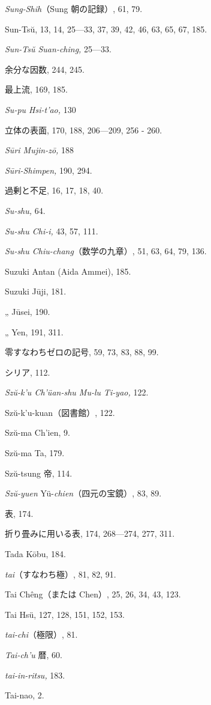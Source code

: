 \documentclass[11pt]{article}
\newcommand{\scanpage}[2]{\clearpage\setcounter{footnote}{0}\noindent{\footnotesize\color{gray}PDF #1 頁 · #2}\par\medskip}
\begin{document}
\scanpage{0358}{印刷頁 344}
\emph{Sung-Shih}（Sung 朝の記録）, 61, 79.\par
Sun-Tsŭ, 13, 14, 25---33, 37, 39, 42, 46, 63, 65, 67, 185.\par
\emph{Sun-Tsŭ Suan-ching,} 25---33.\par
余分な因数, 244, 245.\par
最上流, 169, 185.\par
\emph{Su-pu Hsi-t'ao,} 130\par
立体の表面, 170, 188, 206---209, 256 - 260.\par
\emph{Sūri Mujin-zō,} 188\par
\emph{Sūri-Shimpen,} 190, 294.\par
過剰と不足, 16, 17, 18, 40.\par
\emph{Su-shu,} 64.\par
\emph{Su-shu Chi-i,} 43, 57, 111.\par
\emph{Su-shu Chiu-chang}（数学の九章）, 51, 63, 64, 79, 136.\par
Suzuki Antan (Aida Ammei), 185.\par
Suzuki Jūji, 181.\par
\quad „ Jūsei, 190.\par
\quad „ Yen, 191, 311.\par
零すなわちゼロの記号, 59, 73, 83, 88, 99.\par
シリア, 112.\par
\emph{Szŭ-k'u Ch'üan-shu Mu-lu Ti-yao,} 122.\par
Szŭ-k'u-kuan（図書館）, 122.\par
Szŭ-ma Ch'ien, 9.\par
Szŭ-ma Ta, 179.\par
Szŭ-tsung 帝, 114.\par
\emph{Szŭ-yuen} Yü-\emph{chien}（四元の宝鏡）, 83, 89.\par
\medskip
表, 174.\par
折り畳みに用いる表, 174, 268---274, 277, 311.\par
Tada Kōbu, 184.\par
\emph{tai}（すなわち極）, 81, 82, 91.\par
Tai Chêng（または Chen）, 25, 26, 34, 43, 123.\par
Tai Hsü, 127, 128, 151, 152, 153.\par
\emph{tai-chi}（極限）, 81.\par
\emph{Tai-ch'u} 暦, 60.\par
\emph{tai-in-ritsu,} 183.\par
Tai-nao, 2.\par
\end{document}
